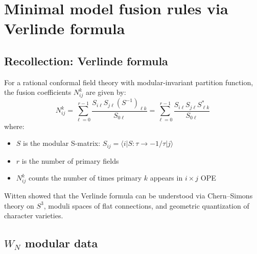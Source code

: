 \section{Minimal model fusion rules via Verlinde formula}
\label{sec:minimal-model-fusion}

\subsection{Recollection: Verlinde formula}
\label{subsec:verlinde-formula-recall}

\begin{theorem}\label{thm:verlinde-general}
For a rational conformal field theory with modular-invariant partition function,
the fusion coefficients $N_{ij}^k$ are given by:
\begin{equation}
N_{ij}^k = \sum_{\ell=0}^{r-1} \frac{S_{i\ell} S_{j\ell} (S^{-1})_{\ell k}}{S_{0\ell}}
= \sum_{\ell=0}^{r-1} \frac{S_{i\ell} S_{j\ell} S_{\ell k}^*}{S_{0\ell}}
\end{equation}
where:
\begin{itemize}
\item $S$ is the modular S-matrix: $S_{ij} = \langle i | S: \tau \to -1/\tau | j \rangle$
\item $r$ is the number of primary fields
\item $N_{ij}^k$ counts the number of times primary $k$ appears in $i \times j$ OPE
\end{itemize}
\end{theorem}

\begin{remark}\label{rem:witten-verlinde}
Witten showed that the Verlinde formula can be understood via Chern--Simons theory on $S^3$, moduli spaces of flat connections, and geometric quantization of character varieties.
\end{remark}

\subsection{\texorpdfstring{$W_N$ modular data}{W N modular data}}
\label{subsec:wn-modular-data}

